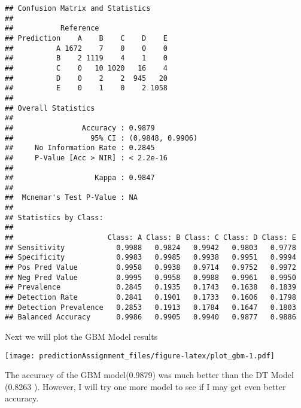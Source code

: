 \documentclass[]{article}
\newenvironment{Shaded}{\begin{snugshade}}{\end{snugshade}}
\newcommand{\DataTypeTok}[1]{\textcolor[rgb]{0.13,0.29,0.53}{#1}}
\newcommand{\DecValTok}[1]{\textcolor[rgb]{0.00,0.00,0.81}{#1}}
\newcommand{\KeywordTok}[1]{\textcolor[rgb]{0.13,0.29,0.53}{\textbf{#1}}}
\newcommand{\NormalTok}[1]{#1}
\newcommand{\OperatorTok}[1]{\textcolor[rgb]{0.81,0.36,0.00}{\textbf{#1}}}
\newcommand{\OtherTok}[1]{\textcolor[rgb]{0.56,0.35,0.01}{#1}}
\newcommand{\StringTok}[1]{\textcolor[rgb]{0.31,0.60,0.02}{#1}}
\begin{document}
\begin{verbatim}
## Confusion Matrix and Statistics
## 
##           Reference
## Prediction    A    B    C    D    E
##          A 1672    7    0    0    0
##          B    2 1119    4    1    0
##          C    0   10 1020   16    4
##          D    0    2    2  945   20
##          E    0    1    0    2 1058
## 
## Overall Statistics
##                                           
##                Accuracy : 0.9879          
##                  95% CI : (0.9848, 0.9906)
##     No Information Rate : 0.2845          
##     P-Value [Acc > NIR] : < 2.2e-16       
##                                           
##                   Kappa : 0.9847          
##                                           
##  Mcnemar's Test P-Value : NA              
## 
## Statistics by Class:
## 
##                      Class: A Class: B Class: C Class: D Class: E
## Sensitivity            0.9988   0.9824   0.9942   0.9803   0.9778
## Specificity            0.9983   0.9985   0.9938   0.9951   0.9994
## Pos Pred Value         0.9958   0.9938   0.9714   0.9752   0.9972
## Neg Pred Value         0.9995   0.9958   0.9988   0.9961   0.9950
## Prevalence             0.2845   0.1935   0.1743   0.1638   0.1839
## Detection Rate         0.2841   0.1901   0.1733   0.1606   0.1798
## Detection Prevalence   0.2853   0.1913   0.1784   0.1647   0.1803
## Balanced Accuracy      0.9986   0.9905   0.9940   0.9877   0.9886
\end{verbatim}

Next we will plot the GBM Model results

\begin{Shaded}
\end{Shaded}

\texttt{[image: predictionAssignment\_files/figure-latex/plot\_gbm-1.pdf]}

The accuracy of the GBM model(0.9879) was much better than the DT Model
(0.8263 ). However, I will try one more model to see if I may get even
better accuracy.
\end{document}
